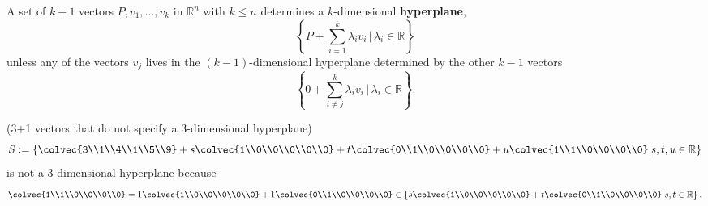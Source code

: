 \begin{definition} A set of $k+1$ vectors $P,v_1, \ldots, v_k$ in $\mathbb{R}^n$ with $k\leq n$ determines a $k$-dimensional {\bfseries hyperplane}, 
\[
\left\{ P + \sum_{i=1}^{k} \lambda_iv_i\,  |\,  \lambda_i \in \mathbb{R} \right\}
\]
unless any of the vectors $v_j$ lives in the $(k-1)$-dimensional hyperplane determined by the other $k-1$ vectors
 \[
\left\{ 0 + \sum_{i\neq j}^{k} \lambda_iv_i\,  |\,  \lambda_i \in \mathbb{R} \right\}.
\]
\end{definition}


\begin{example}{(3+1 vectors that do not specify a  3-dimensional hyperplane)}
\[S:=\left\{ \colvec{3\\1\\4\\1\\5\\9} + s\colvec{1\\0\\0\\0\\0\\0} + t\colvec{0\\1\\0\\0\\0\\0} +u \colvec{1\\1\\0\\0\\0\\0}\middle\vert s, t,u \in \mathbb{R} \right\}\] 
is not a 3-dimensional hyperplane because 
\[\colvec{1\\1\\0\\0\\0\\0}=1\colvec{1\\0\\0\\0\\0\\0} + 1\colvec{0\\1\\0\\0\\0\\0} \in  \left\{     s\colvec{1\\0\\0\\0\\0\\0} + t\colvec{0\\1\\0\\0\\0\\0}  \middle\vert  s,t \in \mathbb{R} \right\}.\]

\end{example}
